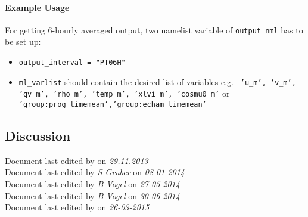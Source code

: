 \paragraph{Example Usage}

For getting 6-hourly averaged output, two namelist variable of \texttt{output\_nml} has to be set up:

\begin{itemize}
  \item \texttt{output\_interval = "PT06H"}
  \item \texttt{ml\_varlist} should contain the desired list of variables e.g. \texttt{ 'u\_m', 'v\_m', 'qv\_m', 'rho\_m', 'temp\_m', 'xlvi\_m', 'cosmu0\_m'} or \texttt{'group:prog\_timemean','group:echam\_timemean'}
\end{itemize}


\subsection*{Discussion}
Document last edited by \textit{\krauti} on \textit{29.11.2013}\\
Document last edited by \textit{S Gruber} on \textit{08-01-2014}\\
Document last edited by \textit{B Vogel} on \textit{27-05-2014}\\
Document last edited by \textit{B Vogel} on \textit{30-06-2014}\\
Document last edited by \textit{\ram} on \textit{26-03-2015}\\


